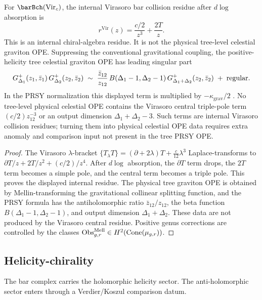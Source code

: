 \begin{theorem}
\label{thm:ch-core-celestial-graviton-ope}
For \(\barBch(\mathrm{Vir}_c)\), the internal Virasoro bar collision residue after $d\log$
absorption is
\[
r^{\mathrm{Vir}}(z)=\frac{c/2}{z^3}+\frac{2T}{z}.
\]
This is an internal chiral-algebra residue. It is not the physical tree-level celestial
graviton OPE. Suppressing the conventional gravitational coupling, the positive-helicity
tree celestial graviton OPE has leading singular part
\[
G^+_{\Delta_1}(z_1,\bar z_1)\,G^+_{\Delta_2}(z_2,\bar z_2)
\;\sim\;
\frac{\bar z_{12}}{z_{12}}\,
B(\Delta_1-1,\Delta_2-1)\,
G^+_{\Delta_1+\Delta_2}(z_2,\bar z_2)
\;+\; \textup{regular}.
\]
In the PRSY normalization this displayed term is multiplied by
\(-\kappa_{\mathrm{grav}}/2\) \cite{PateRaclariuStromingerYuan19}. No tree-level physical
celestial OPE contains the Virasoro central triple-pole term \((c/2)z_{12}^{-3}\) or an output dimension
\(\Delta_1+\Delta_2-3\). Such terms are internal Virasoro collision residues; turning them
into physical celestial OPE data requires extra anomaly and comparison input not present in
the tree PRSY OPE.
\end{theorem}

\begin{proof}
The Virasoro $\lambda$-bracket
\(\{T{}_\lambda T\}=(\partial+2\lambda)T+\frac{c}{12}\lambda^3\) Laplace-transforms to
\(\partial T/z+2T/z^2+(c/2)/z^4\). After $d\log$ absorption, the \(\partial T\) term drops,
the \(2T\) term becomes a simple pole, and the central term becomes a triple pole. This
proves the displayed internal residue. The physical tree graviton OPE is obtained by
Mellin-transforming the gravitational collinear splitting function, and the PRSY formula
has the antiholomorphic ratio \(\bar z_{12}/z_{12}\), the beta function
\(B(\Delta_1-1,\Delta_2-1)\), and output dimension \(\Delta_1+\Delta_2\). These data are not
produced by the Virasoro central residue. Positive genus corrections are controlled by the classes
\(\operatorname{Obs}^{\mathrm{Mell}}_{g,r}\in H^2(\operatorname{Cone}(\mu_{g,r}))\).
\end{proof}


\subsection{Helicity-chirality}
\label{subsec:ch-core-helicity-chirality}

The bar complex carries the holomorphic helicity sector. The anti-holomorphic sector enters through a Verdier/Koszul comparison datum.

